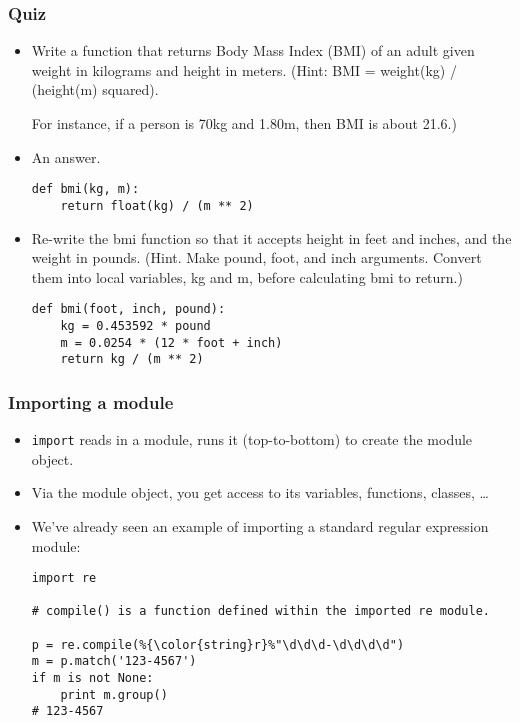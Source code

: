 \documentclass{beamer}
\begin{document}
\begin{frame}[fragile]
\frametitle{Quiz}
\begin{itemize}
\item Write a function that returns Body Mass Index
      (BMI)
      of an adult given weight in kilograms and 
      height in meters.
      (Hint: BMI = weight(kg) / (height(m) squared).

      For instance, if a person is 70kg and 1.80m,
      then BMI is about 21.6.)

\item<2-> An answer.
\begin{lstlisting}
def bmi(kg, m):
    return float(kg) / (m ** 2)
\end{lstlisting}
\item<3-> Re-write
    the bmi function so that it accepts height in feet
    and inches, and the weight in pounds. (Hint. Make pound, foot,
    and inch arguments. Convert them into local
    variables, kg and m, before calculating bmi to return.)
\begin{lstlisting}
def bmi(foot, inch, pound):
    kg = 0.453592 * pound
    m = 0.0254 * (12 * foot + inch)
    return kg / (m ** 2)
\end{lstlisting}
\end{itemize}
\end{frame}

\begin{frame}[fragile]
\frametitle{Importing a module}
\begin{itemize}
\item \lstinline{import} reads in a module, runs
      it (top-to-bottom) to create the module
      object.
\item Via the module object, you get access to its
      variables, functions, classes, \ldots
\item We've already seen an example of importing
      a standard regular expression module:
\begin{lstlisting}[escapechar=\%]
import re 

# compile() is a function defined within the imported re module.

p = re.compile(%{\color{string}r}%"\d\d\d-\d\d\d\d")
m = p.match('123-4567')
if m is not None:
    print m.group()
# 123-4567
\end{lstlisting}
\end{itemize}
\end{frame}
\end{document}
